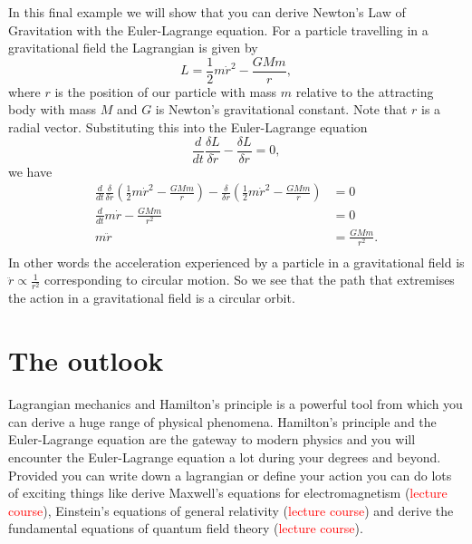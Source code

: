 \documentclass{article}
\begin{document}
In this final example we will show that you can derive Newton's Law of Gravitation with the Euler-Lagrange equation. For a particle travelling in a gravitational field the Lagrangian is given by 
\begin{equation}
    L = \frac{1}{2} m \dot{r}^2 - \frac{G M m}{r},
\end{equation}
where $r$ is the position of our particle with mass $m$ relative to the attracting body with mass $M$ and $G$ is Newton's gravitational constant. Note that $r$ is a radial vector. Substituting this into the Euler-Lagrange equation
\begin{equation}
    \frac{d}{dt}\frac{\delta L}{\delta \dot{r}} - \frac{\delta L}{\delta r} = 0,
\end{equation}
we have
\begin{equation}
    \begin{aligned}
    \frac{d}{dt}\frac{\delta }{\delta \dot{r}} (\frac{1}{2} m \dot{r}^2 - \frac{GMm}{r}) - \frac{\delta }{\delta r} (\frac{1}{2} m \dot{r}^2 - \frac{GMm}{r}) & = 0 \\
    \frac{d}{dt} m\dot{r} - \frac{GMm}{r^2} & = 0 \\
    m \ddot{r} & = \frac{GMm}{r^2}. \\
    \end{aligned}
\end{equation}
In other words the acceleration experienced by a particle in a gravitational field is $\ddot{r} \propto \frac{1}{r^2}$ corresponding to circular motion. So we see that the path that extremises the action in a gravitational field is a circular orbit.

\section{The outlook}

Lagrangian mechanics and Hamilton's principle is a powerful tool from which you can derive a huge range of physical phenomena. Hamilton's principle and the Euler-Lagrange equation are the gateway to modern physics and you will encounter the Euler-Lagrange equation a lot during your degrees and beyond. Provided you can write down a lagrangian or define your action you can do lots of exciting things like derive Maxwell's equations for electromagnetism (\textcolor{red}{lecture course}), Einstein's equations of general relativity (\textcolor{red}{lecture course}) and derive the fundamental equations of quantum field theory (\textcolor{red}{lecture course}). 
\end{document}
